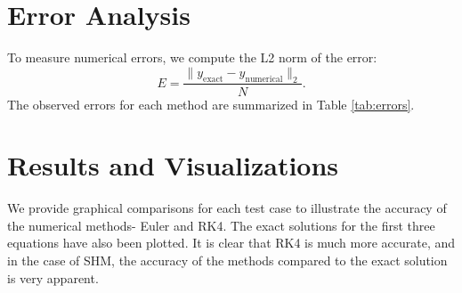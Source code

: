 \documentclass{article}
\begin{document}
\section{Error Analysis}
To measure numerical errors, we compute the L2 norm of the error:
\begin{equation}
    E = \frac{\| y_{\text{exact}} - y_{\text{numerical}} \|_2}{N}.
\end{equation}
The observed errors for each method are summarized in Table \ref{tab:errors}.



\clearpage
\section{Results and Visualizations}
We provide graphical comparisons for each test case to illustrate the accuracy of the numerical methods- Euler and RK4. The exact solutions for the first three equations have also been plotted. It is clear that RK4 is much more accurate, and in the case of SHM, the accuracy of the methods compared to the exact solution is very apparent.
\end{document}
